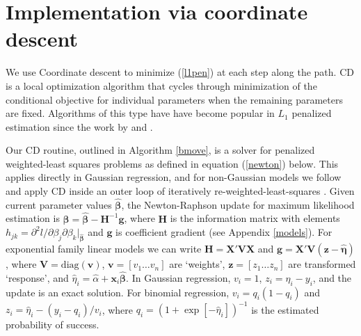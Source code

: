 \documentclass[12pt]{article}
\newcommand{\bs}[1]{\boldsymbol{#1}}
\newcommand{\mr}[1]{\mathrm{#1}}
\newcommand{\bm}[1]{\mathbf{#1}}
\begin{document}
\section{Implementation via coordinate descent}
\label{implement}

We use Coordinate descent \citep[CD; e.g.,][]{luenberger_linear_2008} to minimize
(\ref{l1pen}) at each step along the path. CD is a local optimization
algorithm that cycles through minimization of the conditional objective for
individual parameters when the remaining parameters are fixed. Algorithms of this type have have become popular in
$L_1$ penalized estimation since the work by \citet{friedman_pathwise_2007} and
\citet{wu_coordinate_2008}.

Our CD routine, outlined in Algorithm \ref{bmove}, is a solver for penalized
weighted-least squares problems as defined in equation (\ref{newton}) below.
This applies directly in Gaussian regression, and for non-Gaussian models  we
follow \citet{friedman_regularization_2010} and apply CD inside an outer loop
of iteratively re-weighted-least-squares \citep[IRLS;
e.g.,][]{green_iteratively_1984}. Given current parameter values
$\bs{\hat\beta}$, the Newton-Raphson update for maximum likelihood estimation
is $\bs{\beta} = \bs{\hat\beta} - \bm{H}^{-1}\bm{g}$, where $\bm{H}$ is the
information matrix with elements $h_{jk} = \partial^2 l/\partial
\beta_j\partial \beta_k |_{\bs{\hat\beta}}$ and $\bm{g}$ is coefficient
gradient (see Appendix \ref{models}). For exponential family linear models we
can write $\bm{H} = \bm{X}'\bm{V}\bm{X}$ and $\bm{g} = \bm{X}'\bm{V}(\bm{z} -
\bs{\hat\eta})$, where $\bm{V} = \mr{diag}(\bm{v})$, $\bm{v} = [v_1\ldots
v_n]$ are `weights', $\bm{z} = [z_1\ldots z_n]$ are transformed `response',
and $\hat\eta_i = \hat\alpha + \bm{x}_i\bs{\hat\beta}$.  In Gaussian
regression,  $v_i = 1$, $z_i=\hat\eta_i - y_i$, and the update is an exact
solution. For binomial regression, $v_i = q_i(1-q_i)$ and $z_i = \hat\eta_i -
(y_i-q_i)/v_i$, where $q_i = (1 + \exp[-\hat\eta_i])^{-1}$ is the  estimated
probability of success.
\end{document}

